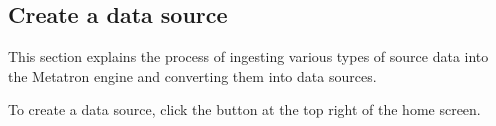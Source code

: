 \documentclass[letterpaper,10pt,english]{sphinxmanual}
\begin{document}
\subsection{Create a data source}
\label{\detokenize{discovery/part02/create_a_data_source:id1}}\label{\detokenize{discovery/part02/create_a_data_source::doc}}
This section explains the process of ingesting various types of source data into the Metatron engine and converting them into data sources.

To create a data source, click the  button at the top right of the  home screen.
\begin{quote}

\begin{figure}[H]
\centering

\noindent{}
\end{figure}
\end{quote}
\end{document}
